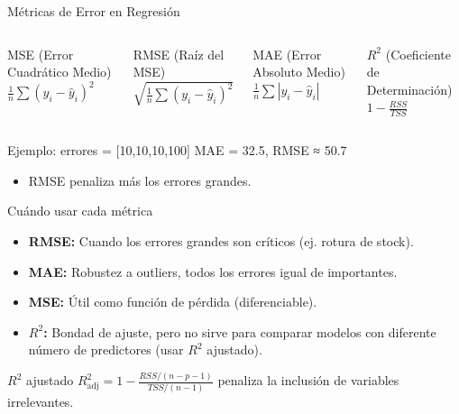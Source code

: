 \documentclass[aspectratio=169, 10pt, xcolor=table]{beamer}
\begin{document}
\begin{frame}{Métricas de Error en Regresión}
    \begin{columns}[t]
        \begin{block}{MSE (Error Cuadrático Medio)}
            $\displaystyle \frac{1}{n}\sum (y_i - \hat{y}_i)^2$
        \end{block}
        \begin{block}{RMSE (Raíz del MSE)}
            $\displaystyle \sqrt{\frac{1}{n}\sum (y_i - \hat{y}_i)^2}$
        \end{block}
        \begin{block}{MAE (Error Absoluto Medio)}
            $\displaystyle \frac{1}{n}\sum |y_i - \hat{y}_i|$
        \end{block}
        \begin{block}{$R^2$ (Coeficiente de Determinación)}
            $\displaystyle 1 - \frac{RSS}{TSS}$
        \end{block}
    \end{columns}
    \vspace{0.3cm}
    \begin{exampleblock}{Ejemplo: errores = [10,10,10,100]}
        MAE = 32.5, \quad RMSE ≈ 50.7
        \begin{itemize}
            \item RMSE penaliza más los errores grandes.
        \end{itemize}
    \end{exampleblock}
\end{frame}

\begin{frame}{Cuándo usar cada métrica}
    \begin{itemize}
        \item \textbf{RMSE:} Cuando los errores grandes son críticos (ej. rotura de stock).
        \item \textbf{MAE:} Robustez a outliers, todos los errores igual de importantes.
        \item \textbf{MSE:} Útil como función de pérdida (diferenciable).
        \item \textbf{$R^2$:} Bondad de ajuste, pero no sirve para comparar modelos con diferente número de predictores (usar $R^2$ ajustado).
    \end{itemize}
    \vspace{0.3cm}
    \begin{block}{$R^2$ ajustado}
        $\displaystyle R^2_{\text{adj}} = 1 - \frac{RSS/(n-p-1)}{TSS/(n-1)}$ penaliza la inclusión de variables irrelevantes.
    \end{block}
\end{frame}
\end{document}
